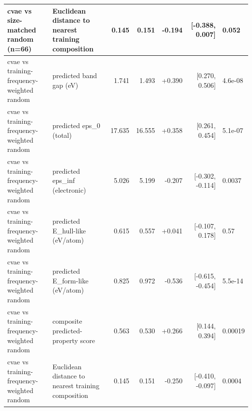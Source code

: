 \begin{table}[t]
\begin{tabular}{llrrrrl}
cvae vs size-matched random (n=66) & Euclidean distance to nearest training composition & 0.145 & 0.151 & -0.194 & [-0.388, 0.007] & 0.052 \\
\midrule
cvae vs training-frequency-weighted random & predicted band gap (eV) & 1.741 & 1.493 & +0.390 & [0.270, 0.506] & 4.6e-08 \\
cvae vs training-frequency-weighted random & predicted eps\_0 (total) & 17.635 & 16.555 & +0.358 & [0.261, 0.454] & 5.1e-07 \\
cvae vs training-frequency-weighted random & predicted eps\_inf (electronic) & 5.026 & 5.199 & -0.207 & [-0.302, -0.114] & 0.0037 \\
cvae vs training-frequency-weighted random & predicted E\_hull-like (eV/atom) & 0.615 & 0.557 & +0.041 & [-0.107, 0.178] & 0.57 \\
cvae vs training-frequency-weighted random & predicted E\_form-like (eV/atom) & 0.825 & 0.972 & -0.536 & [-0.615, -0.454] & 5.5e-14 \\
cvae vs training-frequency-weighted random & composite predicted-property score & 0.563 & 0.530 & +0.266 & [0.144, 0.394] & 0.00019 \\
cvae vs training-frequency-weighted random & Euclidean distance to nearest training composition & 0.145 & 0.151 & -0.250 & [-0.410, -0.097] & 0.0004 \\
\bottomrule
\end{tabular}
\end{table}

